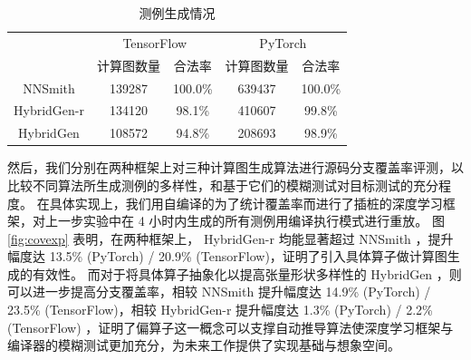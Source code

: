 \begin{table}[]
\centering
\caption{测例生成情况}
\label{tab:num_tests}
\begin{tabular}{ccccc}
  \toprule
  \multirow{2}{*}{} & \multicolumn{2}{c}{TensorFlow} & \multicolumn{2}{c}{PyTorch} \\ \cmidrule(lr){2-3} \cmidrule(lr){4-5} 
                    & 计算图数量        & 合法率             & 计算图数量      & 合法率            \\ \midrule
  NNSmith           & 139287       & 100.0\%      & 639437     & 100.0\%     \\
  HybridGen-r       & 134120       & 98.1\%      & 410607     & 99.8\%     \\
  HybridGen         & 108572       & 94.8\%      & 208693     & 98.9\%     \\ \bottomrule
\end{tabular}
\end{table}

然后，我们分别在两种框架上对三种计算图生成算法进行源码分支覆盖率评测，以比较不同算法所生成测例的多样性，和基于它们的模糊测试对目标测试的充分程度。
在具体实现上，我们用自编译的为了统计覆盖率而进行了插桩的深度学习框架，对上一步实验中在 4 小时内生成的所有测例用编译执行模式进行重放。
图 \ref{fig:covexp} 表明，在两种框架上， HybridGen-r 均能显著超过 NNSmith ，提升幅度达 13.5\% (PyTorch) / 20.9\% (TensorFlow)，证明了引入具体算子做计算图生成的有效性。
而对于将具体算子抽象化以提高张量形状多样性的 HybridGen ，则可以进一步提高分支覆盖率，相较 NNSmith 提升幅度达 14.9\% (PyTorch) / 23.5\% (TensorFlow)，相较 HybridGen-r 提升幅度达 1.3\% (PyTorch) / 2.2\% (TensorFlow) ，证明了偏算子这一概念可以支撑自动推导算法使深度学习框架与编译器的模糊测试更加充分，为未来工作提供了实现基础与想象空间。

